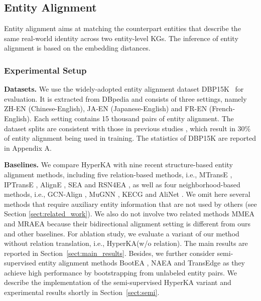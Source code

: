 \documentclass[11pt,a4paper]{article}
\newcommand{\modelname}{HyperKA\xspace}
\begin{document}
\subsection{Entity Alignment}
\label{subsect:ea}
Entity alignment aims at matching the counterpart entities that describe the same real-world identity across two entity-level KGs.
The inference of entity alignment is based on the embedding distances.

\subsubsection{Experimental Setup}
\noindent \textbf{Datasets.}
We use the widely-adopted entity alignment dataset DBP15K~\cite{JAPE} for evaluation. It is extracted from DBpedia \cite{lehmann2015dbpedia} and consists of three settings, namely ZH-EN (Chinese-English), JA-EN (Japanese-English) and FR-EN (French-English). Each setting contains 15 thousand pairs of entity alignment. The dataset splits are consistent with those in previous studies \cite{JAPE,BootEA}, which result in 30\% of entity alignment being used in training. The statistics of DBP15K are reported in Appendix A.



\noindent \textbf{Baselines.}
We compare \modelname with nine recent structure-based entity alignment methods, including five relation-based methods, i.e., MTransE \cite{MTransE}, IPTransE \cite{IPTransE}, AlignE \cite{BootEA}, SEA \cite{SEA} and RSN4EA \cite{RSN}, as well as four neighborhood-based methods, i.e., GCN-Align \cite{GCN_Align}, MuGNN \cite{MuGNN}, KECG \cite{KECG} and AliNet \cite{AliNet}. We omit here several methods that require auxiliary entity information that are not used by others (see Section \ref{sect:related_work}). We also do not involve two related methods MMEA \cite{MMEA} and MRAEA \cite{MRAEA} because their bidirectional alignment setting is different from ours and other baselines. For ablation study, we evaluate a variant of our method without relation translation, i.e., \modelname (w/o relation). The main results are reported in Section~\ref{sect:main_results}. Besides, we further consider semi-supervised entity alignment methods BootEA \cite{BootEA}, NAEA \cite{NAEA} and TransEdge \cite{TransEdge} as they achieve high performance by bootstrapping from unlabeled entity pairs. We describe the implementation of the semi-supervised \modelname variant and experimental results shortly in Section~\ref{sect:semi}.
\end{document}
